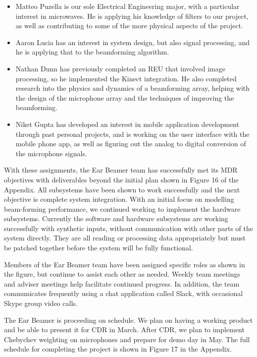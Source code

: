 \documentclass[10pt,journal,compsoc]{IEEEtran}
\begin{document}
\begin{itemize}

\item Matteo Puzella is our sole Electrical Engineering major, with a particular interest in microwaves. He is applying his knowledge of filters to our project, as well as contributing to some of the more physical aspects of the project.
\item Aaron Lucia has an interest in system design, but also signal processing, and he is applying that to the beamforming algorithm.

\item Nathan Dunn has previously completed an REU that involved image processing, so he implemented the Kinect integration. He also completed research into the physics and dynamics of a beamforming array, helping with the design of the microphone array and the techniques of improving the beamforming.

\item Niket Gupta has developed an interest in mobile application development through past personal projects, and is working on the user interface with the mobile phone app, as well as figuring out the analog to digital conversion of the microphone signals.

\end{itemize}

With these assignments, the Ear Beamer team has successfully met its MDR objectives with deliverables beyond the initial plan shown in Figure 16 of the Appendix.  All subsystems have been shown to work successfully and the next objective is complete system integration.  With an initial focus on modelling beam-forming performance, we continued working to implement the hardware subsystems.  Currently the software and hardware subsystems are working successfully with synthetic inputs, without communication with other parts of the system directly.  They are all reading or processing data appropriately but must be patched together before the system will be fully functional.

Members of the Ear Beamer team have been assigned specific roles as shown in the figure, but continue to assist each other as needed. Weekly team meetings and adviser meetings help facilitate continued progress.  In addition, the team communicates frequently using a chat application called Slack, with occasional Skype group video calls.

The Ear Beamer is proceeding on schedule. We plan on having a working product and be able to present it for CDR in March. After CDR, we plan to implement Chebychev weighting on microphones and prepare for demo day in May. The full schedule for completing the project is shown in Figure 17 in the Appendix.
\end{document}
